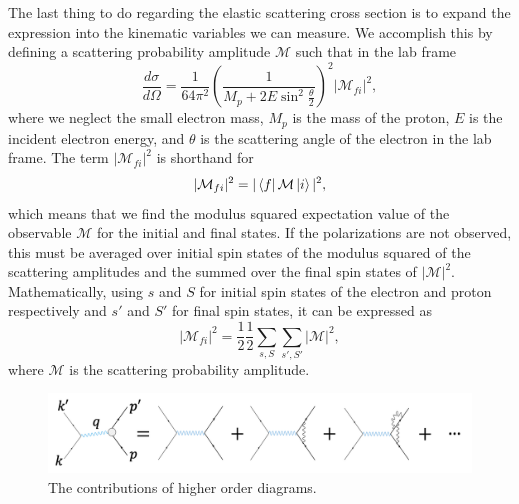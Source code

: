 The last thing to do regarding the elastic scattering cross section is to expand the expression into the kinematic variables we can measure. We accomplish this by defining a scattering probability amplitude $\mathcal{M}$ such that in the lab frame
\begin{equation}
\frac{d\sigma}{d\Omega} = \frac{1}{64\pi^2} \left( \frac{1}{M_p + 2E \sin^2 \frac{\theta}{2}} \right)^2 |\mathcal{M}_{fi}|^2,
\end{equation} 
where we neglect the small electron mass, $M_p$ is the mass of the proton, $E$ is the incident electron energy, and $\theta$ is the scattering angle of the electron in the lab frame. The term $|\mathcal{M}_{fi}|^2$ is shorthand for
\begin{equation}
|\mathcal{M}_{fi}|^2 = |\bra{f} \mathcal{M} \ket{i}|^2,
\end{equation}
which means that we find the modulus squared expectation value of the observable $\mathcal{M}$ for the initial and final states. If the polarizations are not observed, this must be averaged over initial spin states of the modulus squared of the scattering amplitudes and the summed over the final spin states of $|\mathcal{M}|^2$. Mathematically, using $s$ and $S$ for initial spin states of the electron and proton respectively and $s'$ and $S'$ for final spin states, it can be expressed as
\begin{equation}
|\mathcal{M}_{fi}|^2 = \frac{1}{2} \frac{1}{2} \sum_{s,S} \sum_{s',S'} |\mathcal{M}|^2,
\end{equation}
where $\mathcal{M}$ is the scattering probability amplitude. 

\begin{figure}[h!]
	\centering
	\includegraphics[width=\linewidth]{figures/feyn_sum.png}
	\caption{The contributions of higher order diagrams.}
	\label{fig:feyn_sum}
\end{figure}

